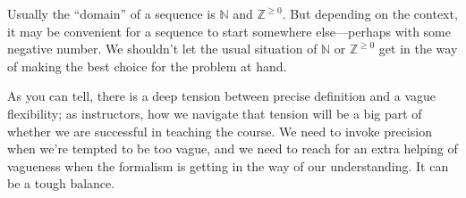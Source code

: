 \documentclass{ximera}
\newcommand{\Z}{\mathbb{Z}}
\newcommand{\N}{\mathbb{N}}
\begin{document}
\begin{warning}
  Usually the ``domain'' of a sequence is $\N$ and $\Z^{\ge 0}$.  But
  depending on the context, it may be convenient for a sequence to
  start somewhere else---perhaps with some negative number.  We
  shouldn't let the usual situation of $\N$ or $\Z^{\ge 0}$ get in the
  way of making the best choice for the problem at hand.
\end{warning}

As you can tell, there is a deep tension between precise definition
and a vague flexibility; as instructors, how we navigate that tension
will be a big part of whether we are successful in teaching the
course.  We need to invoke precision when we're tempted to be too
vague, and we need to reach for an extra helping of vagueness when the
formalism is getting in the way of our understanding.  It can be a
tough balance.
\end{document}
